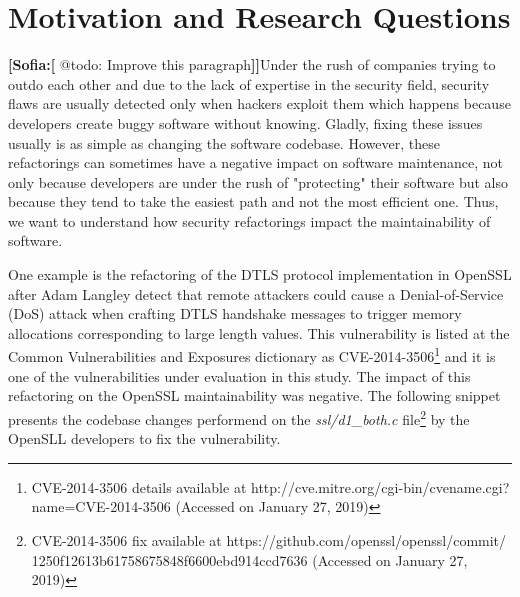 \documentclass[10pt,conference]{IEEEtran}
\newcommand{\Sof}[1]{\textbf{[Sofia:[}{\color{red} #1}\textbf{]]}}
\begin{document}
\section{Motivation and Research Questions}\label{sec:motivation}


\Sof{@todo: Improve this paragraph}Under the rush of companies trying to outdo each other and due to the lack of expertise in the security field, security flaws are usually detected only when hackers exploit them which happens
because developers create buggy software without knowing. Gladly, fixing these
issues usually is as simple as changing the software codebase. However,
these refactorings can sometimes have a negative impact on software maintenance, not
only because developers are under the rush of "protecting" their software but also because 
they tend to take the easiest path and not the most efficient one. Thus, we
want to understand how security refactorings impact the maintainability of software.

One example is the refactoring of the DTLS protocol implementation in OpenSSL after
Adam Langley detect that remote attackers could cause a Denial-of-Service (DoS) attack
when crafting DTLS handshake messages to trigger memory allocations corresponding to large length values. 
This vulnerability is listed at the Common Vulnerabilities and Exposures dictionary as CVE-2014-3506\footnote{CVE-2014-3506 details available at http://cve.mitre.org/cgi-bin/cvename.cgi?name=CVE-2014-3506 (Accessed on January 27, 2019)} and 
it is one of the vulnerabilities under evaluation in this study. The impact of this refactoring
on the OpenSSL maintainability was negative. The following snippet presents the codebase changes 
performend on the \emph{ssl/d1\_both.c} file\footnote{CVE-2014-3506 fix available  at https://github.com/openssl/openssl/commit/\\1250f12613b61758675848f6600ebd914ccd7636 (Accessed on January 27, 2019)} by the OpenSLL developers to fix the vulnerability.
\end{document}
